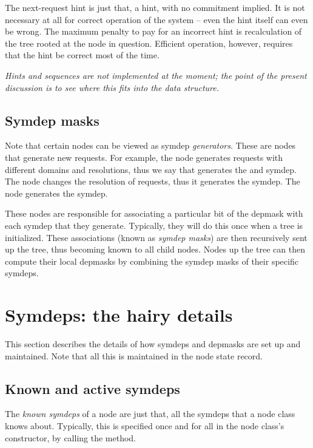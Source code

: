   The next-request hint is just that, a hint, with no commitment implied. It is
  not necessary at all for correct operation of the system -- even the hint
  itself can even be wrong. The maximum penalty to pay for an incorrect hint is
  recalculation of the tree rooted at the node in question. Efficient
  operation, however, requires that the hint be correct most of the time.

  {\em Hints and sequences are not implemented at the moment; the point of
  the present discussion is to see where this fits into the data structure.}

\subsection{Symdep masks}

  Note that certain nodes can be viewed as symdep {\em generators}. These are
  nodes that generate new requests. For example, the  node generates
  requests with different domains and resolutions, thus we say that 
  generates the  and  symdep. The  node
  changes the resolution of requests, thus it generates the 
  symdep. The  node generates the  symdep.
  
  These nodes are responsible for associating a particular bit of the depmask
  with each symdep that they generate. Typically, they will do this once when a
  tree is initialized. These associations (known as {\em symdep masks}) are
  then recursively sent up the tree, thus becoming known to all child nodes.
  Nodes up the tree can then compute their local depmasks by combining the
  symdep masks of their specific symdeps.

\section{Symdeps: the hairy details}

  This section describes the details of how symdeps and depmasks are set up and
  maintained. Note that all this is maintained in the node state record.

\subsection{Known and active symdeps} 
  
  The {\em known symdeps} of a node are just that, all the symdeps that a node
  class knows about. Typically, this is specified once and for all in the
  node class's constructor, by calling the  method.
  
